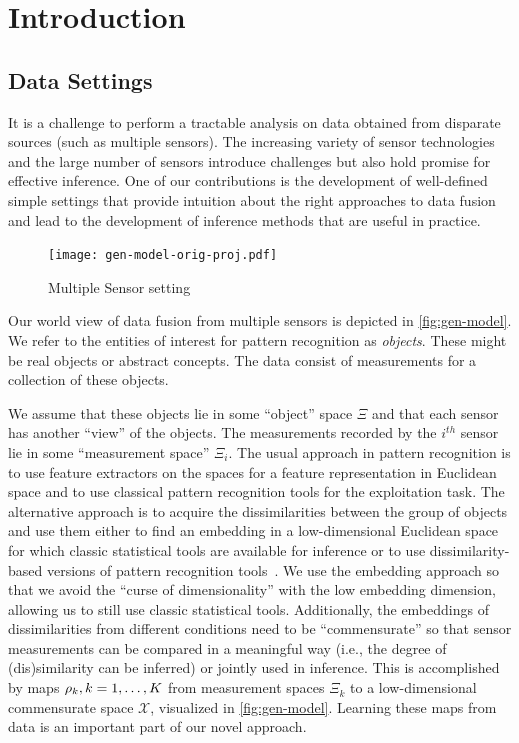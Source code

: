 \documentclass[12pt,oneside,final]{thesis}\usepackage[]{graphicx}\usepackage[]{color}
\begin{document}
\chapter{Introduction}
\label{sec:intro}


\section{Data Settings}


 It is a challenge to perform a tractable analysis on data obtained from disparate sources (such as multiple sensors). The increasing variety of sensor technologies and the large number of sensors introduce challenges but also hold promise for effective inference. One of our contributions is the development of well-defined simple settings that provide intuition about the right approaches to data fusion and lead to the development of  inference methods that are  useful in practice.
 
 
\begin{figure}
\centering
\texttt{[image: gen-model-orig-proj.pdf]}
\caption{Multiple Sensor setting \label{fig:gen-model}}
\end{figure}

 Our world view of data fusion from multiple sensors is depicted in \autoref{fig:gen-model}. We refer to the entities of interest for pattern recognition as \emph{objects}. These might be real objects or abstract concepts. The data consist  of measurements for a collection of these objects.

 We assume that these objects lie in some ``object'' space $\Xi$ and that each sensor has another ``view'' of the objects. The measurements recorded by the $i^{th}$ sensor lie in some ``measurement space'' $\Xi_i$. The usual approach in pattern 
recognition is to use feature extractors on the spaces for a feature representation in Euclidean space and to use classical pattern recognition tools for the exploitation task. The alternative approach is to acquire the dissimilarities between the group of objects and use them   either to find an embedding in a low-dimensional Euclidean space for which classic statistical tools are available for inference or to use dissimilarity-based versions of pattern recognition tools~\cite{duin2005dissimilarity}. 
We use the embedding approach  so  that we avoid the ``curse of dimensionality'' with the low embedding dimension, allowing us to still use classic statistical tools. Additionally, the embeddings of dissimilarities from different conditions need to be ``commensurate'' so that sensor measurements can be compared in a meaningful way (i.e., the degree of (dis)similarity can be inferred) or jointly used in inference. This is accomplished by maps $\rho_k,\onespace k=1,\ldots,K$ from measurement spaces $\Xi_k$ to a low-dimensional commensurate space $\mathcal{X}$, visualized in \autoref{fig:gen-model}. Learning these maps from data is an important part of our novel approach.
\label{sec:data}
\end{document}
